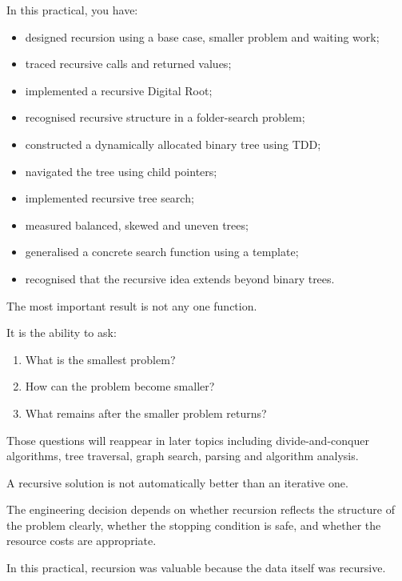 \documentclass{csc2059practical}
\begin{document}

In this practical, you have:

\begin{itemize}
    \item designed recursion using a base case, smaller problem and waiting work;
    \item traced recursive calls and returned values;
    \item implemented a recursive Digital Root;
    \item recognised recursive structure in a folder-search problem;
    \item constructed a dynamically allocated binary tree using TDD;
    \item navigated the tree using child pointers;
    \item implemented recursive tree search;
    \item measured balanced, skewed and uneven trees;
    \item generalised a concrete search function using a template;
    \item recognised that the recursive idea extends beyond binary trees.
\end{itemize}

The most important result is not any one function.

It is the ability to ask:

\begin{enumerate}
    \item What is the smallest problem?
    \item How can the problem become smaller?
    \item What remains after the smaller problem returns?
\end{enumerate}

Those questions will reappear in later topics including divide-and-conquer
algorithms, tree traversal, graph search, parsing and algorithm analysis.

\begin{importantnote}
A recursive solution is not automatically better than an iterative one.

The engineering decision depends on whether recursion reflects the structure of
the problem clearly, whether the stopping condition is safe, and whether the
resource costs are appropriate.

In this practical, recursion was valuable because the data itself was
recursive.
\end{importantnote}
\end{document}

